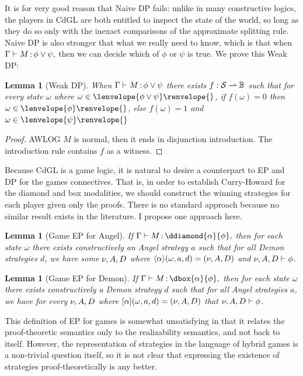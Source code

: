 \documentclass[12pt]{cmuthesis}
\newtheorem{lemma}[theorem]{Lemma}
\theoremstyle{definition}
\theoremstyle{remark}
\newcommand{\allstate}{\mathcal{S}}
\newcommand{\CdGL}{\textsf{CdGL}\xspace}
\newcommand{\fint}[1]{\lenvelope{#1}\renvelope}
\begin{document}
It is for very good reason that Naive DP fails: unlike in many constructive logics, the players in \CdGL are both entitled to inspect the state of the world, so long as they do so only with the inexact comparisons of the approximate splitting rule.
Naive DP is also stronger that what we really need to know, which is that when $\Gamma \vdash M\mathop{:}\phi \lor \psi,$ then we can decide which of $\phi$ or $\psi$ is true.
We prove this Weak DP:
\begin{lemma}[Weak DP]
When $\Gamma \vdash M\mathop{:}\phi \lor \psi$ there exists $f : \allstate \mto \mathbb{B}$ such that for every state $\omega$ where $\omega \in \fint{\phi \lor \psi}{}$, if $f(\omega)=0$ then $\omega \in \fint{\phi}{}$, else $f(\omega)=1$ and $\omega \in \fint{\psi}{}
$\end{lemma}
\begin{proof}
  AWLOG $M$ is normal, then it ends in disjunction introduction.
  The introduction rule contains $f$ as a witness.
\end{proof}

Because \CdGL is a game logic, it is natural to desire a counterpart to EP and DP for the games connectives.
That is, in order to establish Curry-Howard for the diamond and box modalities, we should construct the winning strategies for each player given only the proofs.
There is no standard approach because no similar result exists in the literature.
I propose one approach here.
\begin{lemma}[Game EP for Angel]
If $\proves{\Gamma}{M}{\ddiamond{\alpha}{\phi}},$ then for each state $\omega$ there exists constructively an Angel strategy $a$ such that for all Demon strategies $d$,
we have some $\nu,A,D$ where $\langle{\alpha}\rangle(\omega,a,d)=(\nu,A,D)$ and $\nu,A,D \vdash \phi$.
\end{lemma}
\begin{lemma}[Game EP for Demon]
If $\proves{\Gamma}{M}{\dbox{\alpha}{\phi}},$ then for each state $\omega$ there exists constructively a Demon strategy $d$ such that for all Angel strategies $a$,
we have for every $\nu,A,D$ where $[{\alpha}](\omega,a,d)=(\nu,A,D)$ that $\nu,A,D \vdash \phi$.
\end{lemma}
This definition of EP for games is somewhat unsatisfying in that it relates the proof-theoretic semantics only to the realizability semantics, and not back to itself.
However, the representation of strategies in the language of hybrid games is a non-trivial question itself, so it is not clear that expressing the existence of strategies proof-theoretically is any better.
\end{document}
